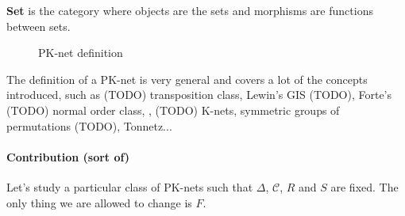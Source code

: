 \documentclass{report}
\begin{document}
\begin{defn}\textbf{Set} is the category where objects are the sets and morphisms are functions between sets.
    \begin{figure}
        \centering
        \caption{PK-net definition}
    \end{figure}
\end{defn}

\begin{tzcategory}{\caption{PK-net definition}}
\end{tzcategory}





The definition of a PK-net is very general and covers a lot of the concepts introduced, such as (TODO) transposition class, Lewin's GIS (TODO), Forte's (TODO) normal order class, , (TODO) K-nets, symmetric groups of permutations (TODO), Tonnetz...

\paragraph{Contribution (sort of)}

Let's study a particular class of PK-nets such that $\Delta$, $\mathcal{C}$, $R$ and $S$ are fixed. The only thing we are allowed to change is $F$.
\end{document}
